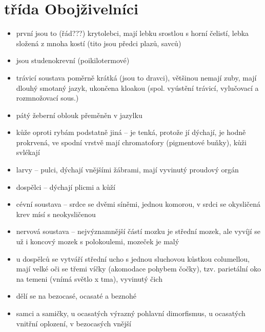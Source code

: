 \documentclass{article}
\begin{document}
\section{třída Obojživelníci}
\begin{itemize}
  \item první jsou to (řád???) krytolebci, mají lebku srostlou s horní čelistí, lebka složená z mnoha kostí (tito jsou předci plazů, savců)
  \item jsou studenokrevní (poikilotermové)
  \item trávicí soustava poměrně krátká (jsou to dravci), většinou nemají zuby, mají dlouhý smotaný jazyk, ukončena kloakou (spol. vyústění trávicí, vylučovací a rozmnožovací sous.)
  \item pátý žeberní oblouk přeměněn v jazylku
  \item kůže oproti rybám podstatně jiná -- je tenká, protože jí dýchají, je hodně prokrvená, ve spodní vrstvě mají chromatofory (pigmentové buňky), kůži svlékají
  \item larvy -- pulci, dýchají vnějšími žábrami, mají vyvinutý proudový orgán
  \item dospělci -- dýchají plicmi a kůží
  \item cévní soustava -- srdce se dvěmi síněmi, jednou komorou, v srdci se okysličená krev mísí s neokysličenou
  \item nervová soustava -- nejvýznamnější částí mozku je střední mozek, ale vyvíjí se už i koncový mozek s polokoulemi, mozeček je malý
  \item u dospělců se vytváří střední ucho s jednou sluchovou kůstkou columellou, mají velké oči se třemi víčky (akomodace pohybem čočky), tzv. parietální oko na temeni (vnímá světlo x tma), vyvinutý čich
  \item dělí se na bezocasé, ocasaté a beznohé
  \item samci a samičky, u ocasatých výrazný pohlavní dimorfismus, u ocasatých vnitřní oplození, v bezocasých vnější
\end{itemize}
\end{document}
